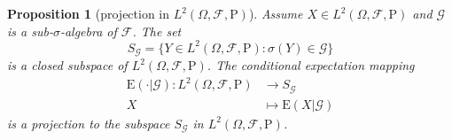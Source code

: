 \documentclass{article}
\newtheorem{proposition}{Proposition}[section]
\theoremstyle{nonumberplain}
\begin{document}
\begin{proposition}[projection in $L^2(\Omega,\mathcal{F},\mathrm{P})$]
	Assume $X\in L^2(\Omega,\mathcal{F},\mathrm{P})$ and $\mathcal{G}$ is a sub-$\sigma$-algebra of $\mathcal{F}$. The set
	\[
	S_\mathcal{G}=\{Y\in L^2(\Omega,\mathcal{F},\mathrm{P}):\sigma(Y)\in \mathcal{G}\}
	\]
	is a closed subspace of $L^2(\Omega,\mathcal{F},\mathrm{P})$.
	The conditional expectation mapping
	\begin{align*}
	\mathrm{E}(\cdot|\mathcal{G}):L^2(\Omega,\mathcal{F},\mathrm{P})&\longrightarrow S_\mathcal{G}\\
	X&\longmapsto \mathrm{E}(X|\mathcal{G})
	\end{align*}
	is a projection to the subspace $S_\mathcal{G}$ in $L^2(\Omega,\mathcal{F},\mathrm{P})$.
\end{proposition}
\end{document}
